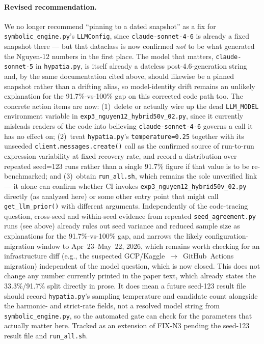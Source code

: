 \documentclass[11pt]{article}
\begin{document}
\paragraph{Revised recommendation.} We no longer recommend ``pinning to a
dated snapshot'' as a fix for \texttt{symbolic\_engine.py}'s
\texttt{LLMConfig}, since \texttt{claude-sonnet-4-6} is already a fixed
snapshot there --- but that dataclass is now confirmed \emph{not} to be
what generated the Nguyen-12 numbers in the first place. The model that
matters, \texttt{claude-sonnet-5} in \texttt{hypatia.py}, is itself
already a dateless post-4.6-generation string and, by the same
documentation cited above, should likewise be a pinned snapshot rather
than a drifting alias, so model-identity drift remains an unlikely
explanation for the 91.7\%-vs-100\% gap on this corrected code path too.
The concrete action items are now: (1)~delete or actually wire up the
dead \texttt{LLM\_MODEL} environment variable in
\texttt{exp3\_nguyen12\_hybrid50v\_02.py}, since it currently misleads
readers of the code into believing \texttt{claude-sonnet-4-6} governs a
call it has no effect on; (2)~treat \texttt{hypatia.py}'s
\texttt{temperature=0.25} together with its unseeded
\texttt{client.messages.create()} call as the confirmed source of
run-to-run expression variability at fixed recovery rate, and record a
distribution over repeated seed=123 runs rather than a single 91.7\%
figure if that value is to be re-benchmarked; and (3)~obtain
\texttt{run\_all.sh}, which remains the sole unverified link --- it alone
can confirm whether CI invokes
\texttt{exp3\_nguyen12\_hybrid50v\_02.py} directly (as analyzed here) or
some other entry point that might call \texttt{get\_llm\_prior()} with
different arguments. Independently of the code-tracing question,
cross-seed and within-seed evidence from repeated
\texttt{seed\_agreement.py} runs (see above) already rules out seed
variance and reduced sample size as explanations for the
91.7\%-vs-100\% gap, and narrows the likely configuration-migration
window to Apr~23--May~22, 2026, which remains worth checking for an
infrastructure diff (e.g., the suspected
GCP/Kaggle~$\to$~GitHub~Actions migration) independent of the model
question, which is now closed. This does not change any number
currently printed in the paper text, which already states the
33.3\%/91.7\% split directly in prose. It does mean a future seed-123
result file should record \texttt{hypatia.py}'s sampling temperature and
candidate count alongside the harmonic- and strict-rate fields, not a
resolved model string from \texttt{symbolic\_engine.py}, so the
automated gate can check for the parameters that actually matter here.
Tracked as an extension of FIX-N3 pending the seed-123 result file and
\texttt{run\_all.sh}.
\end{document}
